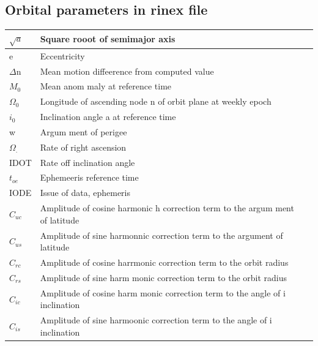 \documentclass[journal,15pt,onecolumn]{IEEEtran}
\begin{document}
\subsection{Orbital parameters in rinex file}
\vspace{2mm}
\begin{tabular}{ | m{6em} | m{6cm}| m{6cm} | } 
  \hline
  $\sqrt{a}$   & Square rooot of semimajor axis \\
  \hline
  e & 
  Eccentricity \\  
  \hline
  $\Delta$n & Mean motion diffeerence from computed value  \\
  \hline
  $M_0$ & Mean anom
  maly at reference time \\
  \hline
  $\Omega_0$ & Longitude of ascending node
  n
  of orbit plane at weekly epoch  \\
  \hline
  $i_0$ & Inclination angle
  a
  at reference time   \\
  \hline
  w & Argum
  ment of perigee \\
  \hline
$\Omega_.$& Rate of right ascension  \\
  \hline
  IDOT & Rate off inclination angle  \\
  \hline
$t_{oe}$  & Ephemeeris reference time  \\
  \hline
  IODE  &  Issue of data, ephemeris \\
  \hline
  $C_{uc}$ & Amplitude of cosine harmonic
  h
  correction term to the
  argum
  ment of latitude   \\
  \hline
  $C_{us}$& Amplitude of sine harmonnic correction term to the argument
  of latitude \\
  \hline
  $C_{rc}$  &  Amplitude of cosine harrmonic correction term to the orbit
  radius \\
  \hline
  $C_{rs}$ & Amplitude of sine harm
  monic correction term to the orbit
  radius  \\
  \hline
  $C_{ic}$ & Amplitude of cosine harm
  monic correction term to the angle of
  i
  inclination \\
  \hline
  $C_{is}$ & Amplitude of sine harmoonic correction term to the angle of
  i
  inclination  \\
  \hline
\end{tabular}
\end{document}
